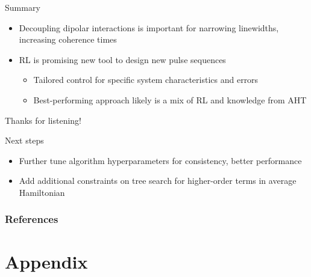 \documentclass{beamer}
\begin{document}
\begin{frame}{Summary}

\begin{itemize}
    \item Decoupling dipolar interactions is important for narrowing linewidths, increasing coherence times
    \item RL is promising new tool to design new pulse sequences
    \begin{itemize}
        \item Tailored control for specific system characteristics and errors
        \item Best-performing approach likely is a mix of RL and knowledge from AHT
    \end{itemize}
\end{itemize}

\pause

\begin{center}
    Thanks for listening!
\end{center}

\end{frame}


\begin{frame}{Next steps}

\begin{itemize}
    \item Further tune algorithm hyperparameters for consistency, better performance
    \item Add additional constraints on tree search for higher-order terms in average Hamiltonian
\end{itemize}

\end{frame}


\begin{frame}[allowframebreaks]
\frametitle{References}

\printbibliography

\end{frame}
















\section{Appendix}
\end{document}
